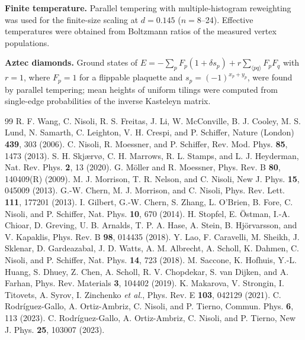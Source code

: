 \documentclass[10pt,twoside]{article}
\begin{document}
\textbf{Finite temperature.} Parallel tempering with multiple-histogram reweighting was used for the finite-size scaling at $d=0.145$ ($n=8$--24). Effective temperatures were obtained from Boltzmann ratios of the measured vertex populations.

\textbf{Aztec diamonds.} Ground states of $E=-\sum_pF_p(1+\delta s_p)+r\sum_{\langle pq\rangle}F_pF_q$ with $r=1$, where $F_p=1$ for a flippable plaquette and $s_p=(-1)^{x_p+y_p}$, were found by parallel tempering; mean heights of uniform tilings were computed from single-edge probabilities of the inverse Kasteleyn matrix.

\begin{thebibliography}{99}
 R. F. Wang, C. Nisoli, R. S. Freitas, J. Li, W. McConville, B. J. Cooley, M. S. Lund, N. Samarth, C. Leighton, V. H. Crespi, and P. Schiffer, Nature (London) \textbf{439}, 303 (2006).
 C. Nisoli, R. Moessner, and P. Schiffer, Rev. Mod. Phys. \textbf{85}, 1473 (2013).
 S. H. Skj{\ae}rv{\o}, C. H. Marrows, R. L. Stamps, and L. J. Heyderman, Nat. Rev. Phys. \textbf{2}, 13 (2020).
 G. M{\"o}ller and R. Moessner, Phys. Rev. B \textbf{80}, 140409(R) (2009).
 M. J. Morrison, T. R. Nelson, and C. Nisoli, New J. Phys. \textbf{15}, 045009 (2013).
 G.-W. Chern, M. J. Morrison, and C. Nisoli, Phys. Rev. Lett. \textbf{111}, 177201 (2013).
 I. Gilbert, G.-W. Chern, S. Zhang, L. O'Brien, B. Fore, C. Nisoli, and P. Schiffer, Nat. Phys. \textbf{10}, 670 (2014).
 H. Stopfel, E. {\"O}stman, I.-A. Chioar, D. Greving, U. B. Arnalds, T. P. A. Hase, A. Stein, B. Hj{\"o}rvarsson, and V. Kapaklis, Phys. Rev. B \textbf{98}, 014435 (2018).
 Y. Lao, F. Caravelli, M. Sheikh, J. Sklenar, D. Gardeazabal, J. D. Watts, A. M. Albrecht, A. Scholl, K. Dahmen, C. Nisoli, and P. Schiffer, Nat. Phys. \textbf{14}, 723 (2018).
 M. Saccone, K. Hofhuis, Y.-L. Huang, S. Dhuey, Z. Chen, A. Scholl, R. V. Chopdekar, S. van Dijken, and A. Farhan, Phys. Rev. Materials \textbf{3}, 104402 (2019).
 K. Makarova, V. Strongin, I. Titovets, A. Syrov, I. Zinchenko \emph{et al.}, Phys. Rev. E \textbf{103}, 042129 (2021).
 C. Rodr{\'i}guez-Gallo, A. Ortiz-Ambriz, C. Nisoli, and P. Tierno, Commun. Phys. \textbf{6}, 113 (2023).
 C. Rodr{\'i}guez-Gallo, A. Ortiz-Ambriz, C. Nisoli, and P. Tierno, New J. Phys. \textbf{25}, 103007 (2023).

\end{thebibliography}
\end{document}

